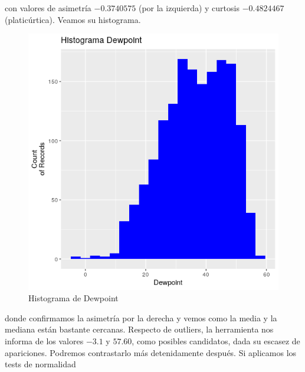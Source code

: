 con valores de asimetría $-0.3740575$ (por la izquierda) y curtosis $-0.4824467$ (platicúrtica). Veamos su histograma.

 
\begin{figure}[H] %
	\centering
	\includegraphics[scale=0.7]{hist-dew.png}  %
	\caption{Histograma de Dewpoint} 
	\label{fig:hist-dew}
\end{figure}

donde confirmamos la asimetría por la derecha y vemos como la media y la mediana están bastante cercanas. Respecto de outliers, la herramienta nos informa de los valores $-3.1$ y $57.60$, como posibles candidatos, dada su escasez de apariciones. Podremos contrastarlo más detenidamente después. Si aplicamos los tests de normalidad 

